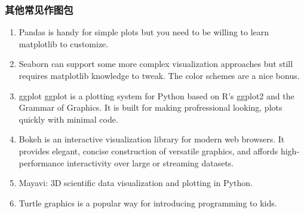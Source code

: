 \documentclass[UTF8,a4paper,12pt]{ctexart}  %
\renewcommand{\refname}{参考文献}            %
\providecommand{\tightlist}{\setlength{\itemsep}{0pt}\setlength{\parskip}{0pt}}
\begin{document}
\hypertarget{ux5176ux4ed6ux5e38ux89c1ux4f5cux56feux5305}{%
\subsubsection{其他常见作图包}\label{ux5176ux4ed6ux5e38ux89c1ux4f5cux56feux5305}}

\begin{enumerate}
\def\labelenumi{\arabic{enumi}.}
\tightlist
\item
  Pandas is handy for simple plots but you need to be willing to learn
  matplotlib to customize.
\item
  Seaborn can support some more complex visualization approaches but
  still requires matplotlib knowledge to tweak. The color schemes are
  a nice bonus.
\item
  ggplot ggplot is a plotting system for Python based on R's ggplot2
  and the Grammar of Graphics. It is built for making profressional
  looking, plots quickly with minimal code.
\item
  Bokeh is an interactive visualization library for modern web
  browsers. It provides elegant, concise construction of versatile
  graphics, and affords high-performance interactivity over large or
  streaming datasets.
\item
  Mayavi: 3D scientific data visualization and plotting in Python.
\item
  Turtle graphics is a popular way for introducing programming to
  kids.
\end{enumerate}



\renewcommand\refname{参考文献}
\pdfbookmark{\refname}{reference}


\end{document}
